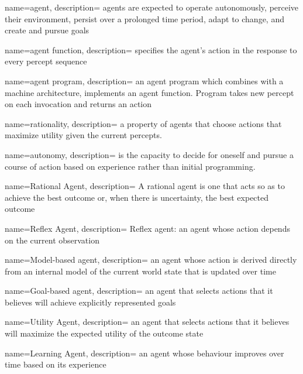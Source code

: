 
{
	name={agent},
	description={
		agents are expected to operate autonomously, perceive their environment, persist over a prolonged time period, adapt to change, and create and pursue goals
	}
}

{
	name={agent function},
	description={
		specifies the \gls{agent}'s action in the response to every percept sequence
	}
}

{
	name={agent program},
	description={
		an agent program which combines with a machine architecture, implements an agent function. Program takes new percept on each invocation and returns an action
	}
}

{
	name={rationality},
	description={
		a property of agents that choose actions that maximize utility given the current percepts.
	}
}

{
    name={autonomy},
    description={
        is the capacity to decide for oneself and pursue a course of action based on experience rather than initial programming.
    }
}

{
	name={Rational Agent},
	description={
		A rational agent is one that acts so as to achieve the
best outcome or, when there is uncertainty, the best expected outcome
	}
}

{
	name={Reflex Agent},
	description={
		Reflex agent: an agent whose action depends on the current observation
	}
}

{
    name={Model-based agent},
    description={
        an agent whose action is derived directly from an internal model of the current world state that is updated over time
    }
}

{
    name={Goal-based agent},
    description={
        an agent that selects actions that it believes will achieve explicitly represented goals
    }
}

{
    name={Utility Agent},
    description=
    {
        an agent that selects actions that it believes will maximize the expected utility of the outcome state
    }
}

{
    name={Learning Agent},
    description=
    {
        an agent whose behaviour improves over time based on its experience
    }
}
